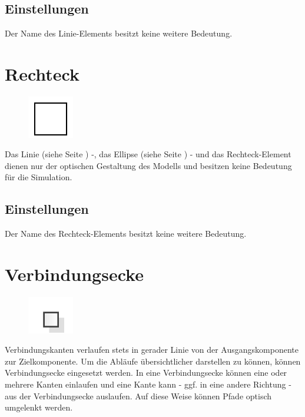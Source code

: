 \subsection*{Einstellungen}

Der Name des Linie-Elements besitzt keine weitere Bedeutung.


\section{Rechteck}
\label{ref:ModelElementRectangle}

\begin{figure}
\vspace{-22pt}
\includegraphics[width=2cm]{imageModelElementRectangle.png}
\vspace{-22pt}
\end{figure}

Das Linie (siehe Seite \pageref{ref:ModelElementLine}) -, das Ellipse (siehe Seite \pageref{ref:ModelElementEllipse}) - und
das Rechteck-Element dienen nur der optischen Gestaltung des Modells und besitzen keine Bedeutung für die Simulation.

\subsection*{Einstellungen}

Der Name des Rechteck-Elements besitzt keine weitere Bedeutung.


\section{Verbindungsecke}
\label{ref:ModelElementVertex}

\begin{figure}
\vspace{-22pt}
\includegraphics[width=2cm]{imageModelElementVertex.png}
\vspace{-22pt}
\end{figure}

Verbindungskanten verlaufen stets in gerader Linie von der Ausgangskomponente zur Zielkomponente.
Um die Abläufe übersichtlicher darstellen zu können, können Verbindungsecke eingesetzt werden. In eine Verbindungsecke können eine
oder mehrere Kanten einlaufen und eine Kante kann - ggf. in eine andere Richtung - aus der Verbindungsecke auslaufen. Auf diese Weise
können Pfade optisch umgelenkt werden.


